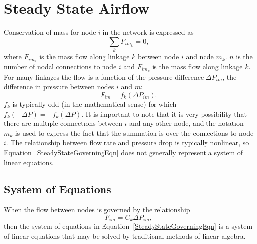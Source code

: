 \documentclass[10pt]{report}
\begin{document}
\section{Steady State Airflow}
Conservation of mass for node $i$ in the network is expressed as
\begin{equation}\label{SteadyStateGoverningEqn}
\sum_{k} F_{im_k} = 0,
\end{equation}
where $F_{im_k}$ is the mass flow along linkage $k$ between node $i$ and node
$m_k$. $n$ is the number of nodal connections to node $i$ and $F_{im_k}$ is
the mass flow along linkage $k$. For many linkages the flow is a function of
the pressure difference $\Delta P_{im}$, the difference in pressure between
nodes $i$ and $m$:
\begin{equation}
F_{im} = f_k\left(\Delta P_{im}\right).
\end{equation}
$f_k$ is typically odd (in the mathematical sense) for which
$f_k\left(-\Delta P\right) = -f_k\left(\Delta P\right)$.
It is important to note that it is very possibility that there are multiple
connections between $i$ and any other node, and the notation $m_k$ is used to
express the fact that the summation is over the connections to node $i$. 
The relationship between flow rate and pressure drop is typically nonlinear,
so Equation~\ref{SteadyStateGoverningEqn} does not generally represent a
system of linear equations.

\subsection{System of Equations}
When the flow between nodes is governed by the relationship
\begin{equation}\label{LinearForm}
F_{im} = C_k\Delta P_{im},
\end{equation}
then the system of equations in Equation~\ref{SteadyStateGoverningEqn} is a system of linear equations that may be solved by traditional methods of linear algebra.
\end{document}
